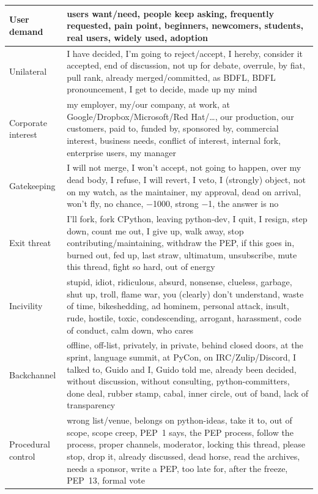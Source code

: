 \documentclass[sigconf,screen]{acmart}
\begin{document}
\begin{table}[t]
\begin{tabular}{p{}p{}}
User demand & users want/need, people keep asking, frequently requested, pain point, beginners, newcomers, students, real users, widely used, adoption \\
\midrule
Unilateral & I have decided, I'm going to reject/accept, I hereby, consider it accepted, end of discussion, not up for debate, overrule, by fiat, pull rank, already merged/committed, as BDFL, BDFL pronouncement, I get to decide, made up my mind \\
Corporate interest & my employer, my/our company, at work, at Google/Dropbox/Microsoft/Red Hat/\ldots, our production, our customers, paid to, funded by, sponsored by, commercial interest, business needs, conflict of interest, internal fork, enterprise users, my manager \\
Gatekeeping & I will not merge, I won't accept, not going to happen, over my dead body, I refuse, I will revert, I veto, I (strongly) object, not on my watch, as the maintainer, my approval, dead on arrival, won't fly, no chance, $-$1000, strong $-$1, the answer is no \\
Exit threat & I'll fork, fork CPython, leaving python-dev, I quit, I resign, step down, count me out, I give up, walk away, stop contributing/maintaining, withdraw the PEP, if this goes in, burned out, fed up, last straw, ultimatum, unsubscribe, mute this thread, fight so hard, out of energy \\
Incivility & stupid, idiot, ridiculous, absurd, nonsense, clueless, garbage, shut up, troll, flame war, you (clearly) don't understand, waste of time, bikeshedding, ad hominem, personal attack, insult, rude, hostile, toxic, condescending, arrogant, harassment, code of conduct, calm down, who cares \\
Backchannel & offline, off-list, privately, in private, behind closed doors, at the sprint, language summit, at PyCon, on IRC/Zulip/Discord, I talked to, Guido and I, Guido told me, already been decided, without discussion, without consulting, python-committers, done deal, rubber stamp, cabal, inner circle, out of band, lack of transparency \\
Procedural control & wrong list/venue, belongs on python-ideas, take it to, out of scope, scope creep, PEP~1 says, the PEP process, follow the process, proper channels, moderator, locking this thread, please stop, drop it, already discussed, dead horse, read the archives, needs a sponsor, write a PEP, too late for, after the freeze, PEP~13, formal vote \\
\bottomrule
\end{tabular}
\end{table}
\end{document}
